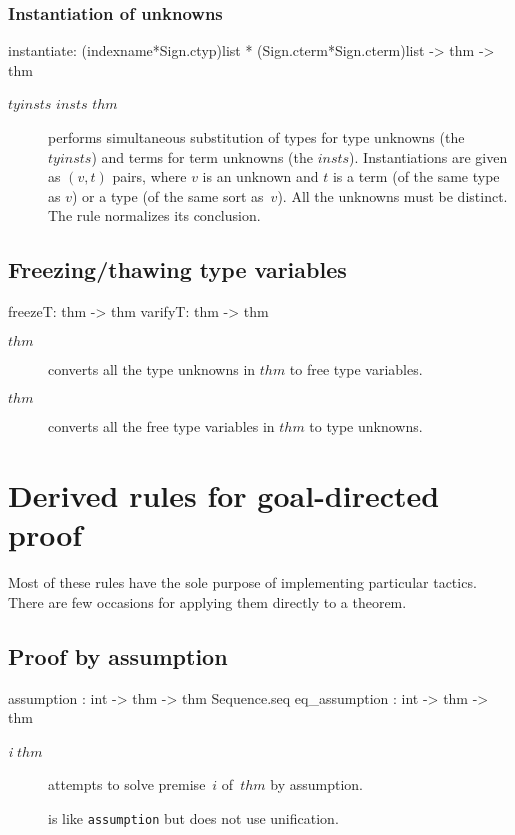\subsubsection{Instantiation of unknowns}
\begin{ttbox} 
instantiate: (indexname*Sign.ctyp)list * (Sign.cterm*Sign.cterm)list
                   -> thm -> thm
\end{ttbox}
\begin{description}
\item[ $tyinsts$ $insts$ $thm$] 
performs simultaneous substitution of types for type unknowns (the
$tyinsts$) and terms for term unknowns (the $insts$).  Instantiations are
given as $(v,t)$ pairs, where $v$ is an unknown and $t$ is a term (of the
same type as $v$) or a type (of the same sort as~$v$).  All the unknowns
must be distinct.  The rule normalizes its conclusion.
\end{description}


\subsection{Freezing/thawing type variables}
\begin{ttbox} 
freezeT: thm -> thm
varifyT: thm -> thm
\end{ttbox}
\begin{description}
\item[ $thm$] 
converts all the type unknowns in $thm$ to free type variables.

\item[ $thm$] 
converts all the free type variables in $thm$ to type unknowns.
\end{description}


\section{Derived rules for goal-directed proof}
Most of these rules have the sole purpose of implementing particular
tactics.  There are few occasions for applying them directly to a theorem.

\subsection{Proof by assumption}
\begin{ttbox} 
assumption    : int -> thm -> thm Sequence.seq
eq_assumption : int -> thm -> thm
\end{ttbox}
\begin{description}
\item[ {\it i} $thm$] 
attempts to solve premise~$i$ of~$thm$ by assumption.

\item[] 
is like {\tt assumption} but does not use unification.
\end{description}


